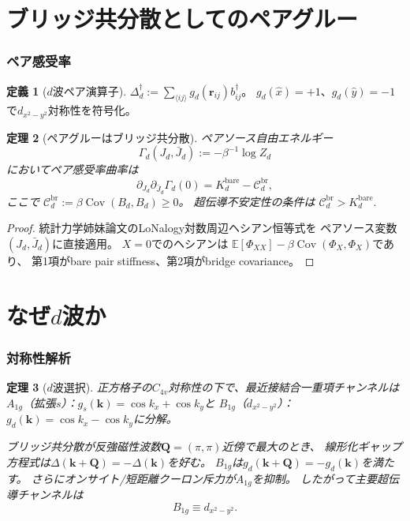 \documentclass[12pt]{article}
\theoremstyle{plain}
\newtheorem{theorem}{定理}[section]
\theoremstyle{definition}
\newtheorem{definition}[theorem]{定義}
\numberwithin{equation}{section}
\newcommand{\br}{\mathrm{br}}
\DeclareMathOperator{\Cov}{Cov}
\begin{document}
\part{ブリッジ共分散としてのペアグルー}

\section{ペア感受率}\label{sec:pairsuscept}

\begin{definition}[$d$波ペア演算子]
$\Delta_d^\dagger := \sum_{\langle ij\rangle}
g_d(\bm{r}_{ij})b_{ij}^\dagger$。
$g_d(\hat{x})=+1$、$g_d(\hat{y})=-1$で$d_{x^2-y^2}$対称性を符号化。
\end{definition}

\begin{theorem}[ペアグルーはブリッジ共分散]\label{thm:glue}
ペアソース自由エネルギー
\[
\Gamma_d(J_d,\bar{J}_d):=-\beta^{-1}\log Z_d
\]
においてペア感受率曲率は
\begin{equation}
\boxed{\partial_{J_d}\partial_{\bar{J}_d}\Gamma_d(0)
= K_d^{\mathrm{bare}} - \mathcal{C}_d^{\br},}
\end{equation}
ここで
$\boxed{\mathcal{C}_d^{\br}:=\beta\Cov(B_d,B_d)\geq 0}$。
超伝導不安定性の条件は
$\boxed{\mathcal{C}_d^{\br} > K_d^{\mathrm{bare}}.}$
\end{theorem}

\begin{proof}
統計力学姉妹論文のLoNalogy対数周辺ヘシアン恒等式を
ペアソース変数$(J_d,\bar{J}_d)$に直接適用。
$X=0$でのヘシアンは
$\mathbb{E}[\Phi_{XX}]-\beta\Cov(\Phi_X,\Phi_X)$であり、
第1項がbare pair stiffness、第2項がbridge covariance。
\end{proof}


\part{なぜ$d$波か}

\section{対称性解析}\label{sec:symmetry}

\begin{theorem}[$d$波選択]\label{thm:dwave}
正方格子の$C_{4v}$対称性の下で、最近接結合一重項チャンネルは
$A_{1g}$（拡張$s$）：$g_s(\bm{k})=\cos k_x+\cos k_y$と
$B_{1g}$（$d_{x^2-y^2}$）：$g_d(\bm{k})=\cos k_x-\cos k_y$に分解。

ブリッジ共分散が反強磁性波数$\bm{Q}=(\pi,\pi)$近傍で最大のとき、
線形化ギャップ方程式は$\Delta(\bm{k}+\bm{Q})=-\Delta(\bm{k})$を好む。
$B_{1g}$は$g_d(\bm{k}+\bm{Q})=-g_d(\bm{k})$を満たす。
さらにオンサイト/短距離クーロン斥力が$A_{1g}$を抑制。
したがって主要超伝導チャンネルは
\begin{equation}
\boxed{B_{1g}\equiv d_{x^2-y^2}.}
\end{equation}
\end{theorem}
\end{document}
